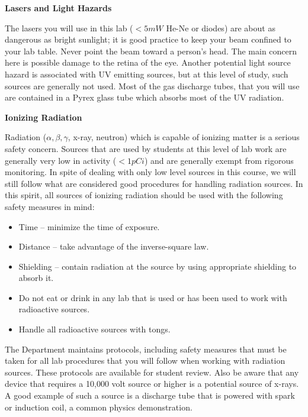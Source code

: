 \begin{enumerate}
{\Large \item \textbf{Lasers and Light Hazards}}

The lasers you will use in this lab ($< 5mW$ He-Ne or diodes) are about as dangerous as bright sunlight; it is good practice to keep your beam confined to your lab table. Never point the beam toward a person's head. The main concern here is possible damage to the retina of the eye. Another potential light source hazard is associated with UV emitting sources, but at this level of study, such sources are generally not used. Most of the gas discharge tubes, that you will use are contained in a Pyrex glass tube which absorbs most of the UV radiation.

{\Large \item \textbf{Ionizing Radiation}}

Radiation ($\alpha, \beta, \gamma$, x-ray, neutron) which is capable of ionizing matter is a serious safety concern. Sources that are used by students at this level of lab work are generally very low in activity ($ <1 pCi$) and are generally exempt from rigorous monitoring. In spite of dealing with only low level sources in this course, we will still follow what are considered good procedures for handling radiation sources. In this spirit, all sources of ionizing radiation should be used with the following safety measures in mind:

\begin{itemize}
	\item Time -- minimize the time of exposure.
	\item Distance -- take advantage of the inverse-square law.
	\item Shielding -- contain radiation at the source by using appropriate shielding to absorb it.
	\item Do not eat or drink in any lab that is used or has been used to work with radioactive sources.
	\item Handle all radioactive sources with tongs.
\end{itemize}
 
 
The Department maintains protocols, including safety measures that must be taken for all lab procedures that you will follow when working with radiation sources. These protocols are available for student review. Also be aware that any device that requires a 10,000 volt source or higher is a potential source of x-rays. A good example of such a source is a discharge tube that is powered with spark or induction coil, a common physics demonstration.


\end{enumerate}
